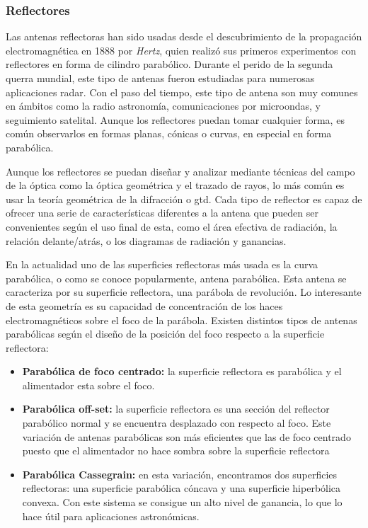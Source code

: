 \subsubsection{Reflectores}

\par Las antenas reflectoras han sido usadas desde el descubrimiento de la propagación electromagnética en 1888 por \textit{Hertz}, quien realizó sus primeros experimentos con reflectores en forma de cilindro parabólico. Durante el perido de la segunda querra mundial, este tipo de antenas fueron estudiadas para numerosas aplicaciones radar. Con el paso del tiempo, este tipo de antena son muy comunes en ámbitos como la radio astronomía, comunicaciones por microondas, y seguimiento satelital. Aunque los reflectores puedan tomar cualquier forma, es común observarlos en formas planas, cónicas o curvas, en especial en forma parabólica. 
\\
\par Aunque los reflectores se puedan diseñar y analizar mediante técnicas del campo de la óptica como la óptica geométrica y el trazado de rayos, lo más común es usar la teoría geométrica de la difracción o \gls{gtd}. Cada tipo de reflector es capaz de ofrecer una serie de características diferentes a la antena que pueden ser convenientes según el uso final de esta, como el área efectiva de radiación, la relación delante/atrás, o los diagramas de radiación y ganancias.
\\
\par En la actualidad uno de las superficies reflectoras más usada es la curva parabólica, o como se conoce popularmente, antena parabólica. Esta antena se caracteriza por su superficie reflectora, una parábola de revolución. Lo interesante de esta geometría es su capacidad de concentración de los haces electromagnéticos sobre el foco de la parábola. Existen distintos tipos de antenas parabólicas según el diseño de la posición del foco respecto a la superficie reflectora:

\begin{itemize}
	\item \textbf{Parabólica de foco centrado: }la superficie reflectora es parabólica y el alimentador esta sobre el foco.
	\item \textbf{Parabólica off-set: }la superficie reflectora es una sección del reflector parabólico normal y se encuentra desplazado con respecto al foco. Este variación de antenas parabólicas son más eficientes que las de foco centrado puesto que el alimentador no hace sombra sobre la superficie reflectora
	\item \textbf{Parabólica Cassegrain: }en esta variación, encontramos dos superficies reflectoras: una superficie parabólica cóncava y una superficie hiperbólica convexa. Con este sistema se consigue un alto nivel de ganancia, lo que lo hace útil para aplicaciones astronómicas.
\end{itemize}

